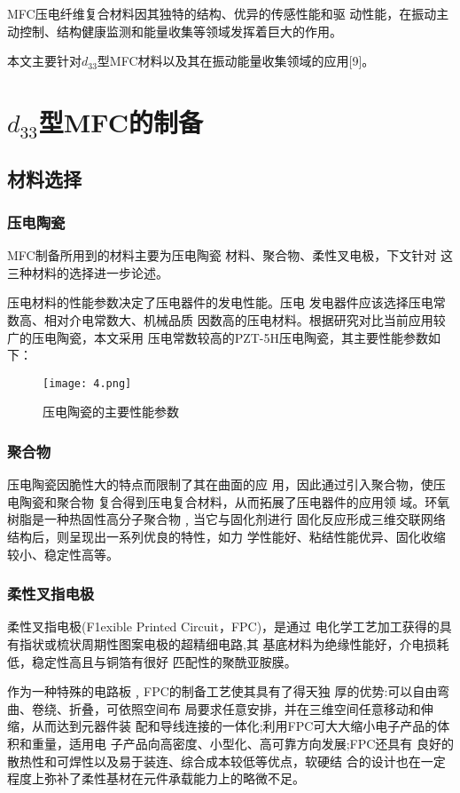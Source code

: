 \documentclass[lang=cn,11pt,a4paper,cite=authoryear]{elegantpaper}
\begin{document}
MFC压电纤维复合材料因其独特的结构、优异的传感性能和驱
动性能，在振动主动控制、结构健康监测和能量收集等领域发挥着巨大的作用。

本文主要针对$d_{33}$型MFC材料以及其在振动能量收集领域的应用[9]。

\section{$d_{33}$型MFC的制备}
\subsection{材料选择}

\subsubsection{压电陶瓷}

MFC制备所用到的材料主要为压电陶瓷
材料、聚合物、柔性叉电极，下文针对
这三种材料的选择进一步论述。

压电材料的性能参数决定了压电器件的发电性能。压电
发电器件应该选择压电常数高、相对介电常数大、机械品质
因数高的压电材料。根据研究对比当前应用较广的压电陶瓷，本文采用
压电常数较高的PZT-5H压电陶瓷，其主要性能参数如下：
\begin{figure}[htbp]
  \centering
  \texttt{[image: 4.png]}
  \caption{压电陶瓷的主要性能参数}
\end{figure}

\subsubsection{聚合物}
压电陶瓷因脆性大的特点而限制了其在曲面的应
用，因此通过引入聚合物，使压电陶瓷和聚合物
复合得到压电复合材料，从而拓展了压电器件的应用领
域。环氧树脂是一种热固性高分子聚合物﹐当它与固化剂进行
固化反应形成三维交联网络结构后，则呈现出一系列优良的特性，如力
学性能好、粘结性能优异、固化收缩较小、稳定性高等。

\subsubsection{柔性叉指电极}
柔性叉指电极(F1exible Printed Circuit，FPC)，是通过
电化学工艺加工获得的具有指状或梳状周期性图案电极的超精细电路,其
基底材料为绝缘性能好，介电损耗低，稳定性高且与铜箔有很好
匹配性的聚酰亚胺膜。

作为一种特殊的电路板﹐FPC的制备工艺使其具有了得天独
厚的优势:可以自由弯曲、卷绕、折叠，可依照空间布
局要求任意安排，并在三维空间任意移动和伸缩，从而达到元器件装
配和导线连接的一体化;利用FPC可大大缩小电子产品的体积和重量，适用电
子产品向高密度、小型化、高可靠方向发展;FPC还具有
良好的散热性和可焊性以及易于装连、综合成本较低等优点，软硬结
合的设计也在一定程度上弥补了柔性基材在元件承载能力上的略微不足。
\end{document}
